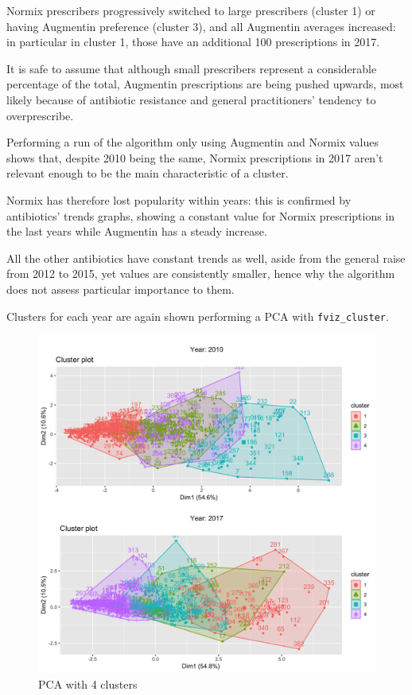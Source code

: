 Normix prescribers progressively switched to large prescribers (cluster 1) or having Augmentin preference (cluster 3), and all Augmentin averages increased: in particular in cluster 1, those have an additional 100 prescriptions in 2017.

It is safe to assume that although small prescribers represent a considerable percentage of the total, Augmentin prescriptions are being pushed upwards, most likely because of antibiotic resistance and general practitioners' tendency to overprescribe.

Performing a run of the algorithm only using Augmentin and Normix values shows that, despite 2010 being the same, Normix prescriptions in 2017 aren't relevant enough to be the main characteristic of a cluster. 

Normix has therefore lost popularity within years: this is confirmed by antibiotics' trends graphs, showing a constant value for Normix prescriptions in the last years while Augmentin has a steady increase.

All the other antibiotics have constant trends as well, aside from the general raise from 2012 to 2015, yet values are consistently smaller, hence why the algorithm does not assess particular importance to them. 

Clusters for each year are again shown performing a PCA with \texttt{fviz\_cluster}.

\begin{figure}[h]
	\centering
	\includegraphics[scale=0.18]{../k-means/clusters-4.png}
	\caption{\small PCA with 4 clusters}
\end{figure}
